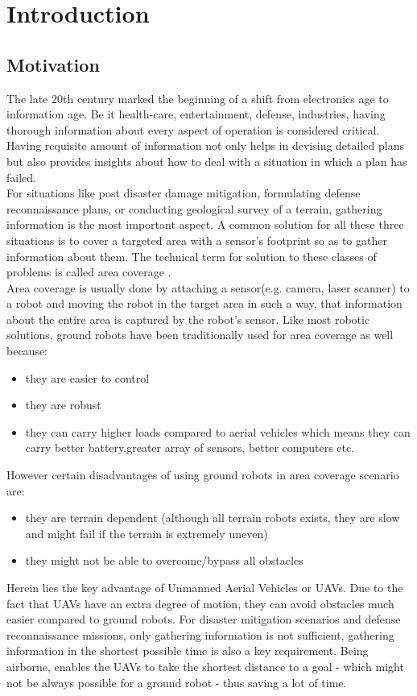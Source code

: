 \section{Introduction}
\subsection{Motivation}
The late 20th century marked the beginning of a shift from electronics age to information age. Be it  health-care, entertainment, defense, industries, having thorough information about every aspect of operation is considered critical. Having requisite amount of information not only helps in devising detailed plans but also provides insights about how to deal with a situation in which a plan has failed.\\
For situations like post disaster damage mitigation, formulating defense reconnaissance plans, or conducting geological survey of a terrain, gathering information is the most important aspect. A common solution for all these three situations is to cover a targeted area with a sensor's  footprint so as to gather information about them. The technical term for solution to these classes of problems is called area coverage \cite{1}. \\
Area coverage is usually done by attaching a sensor(e.g. camera, laser scanner) to a robot and moving the robot in the target area in such a way, that information about the entire area is captured by the robot's sensor. Like most robotic solutions, ground robots have been traditionally used for area coverage as well because:
\begin{itemize}
\item they are easier to control
\item they are robust
\item they can carry higher loads compared to aerial vehicles which means they can carry better battery,greater array of sensors, better computers etc.
\end{itemize}
However certain disadvantages of using ground robots in area coverage scenario are:
\begin{itemize}
\item they are terrain dependent (although all terrain robots exists, they are slow and might fail if the terrain is extremely uneven)
\item they might not be able to overcome/bypass all obstacles
\end{itemize}
Herein lies the key advantage of Unmanned Aerial Vehicles or UAVs. Due to the fact that UAVs have an extra degree of motion, they can avoid obstacles much easier compared to ground robots. For disaster mitigation scenarios and defense reconnaissance missions, only gathering information is not sufficient, gathering information in the shortest possible time is also a key requirement. Being airborne, enables the UAVs to take the shortest distance to a goal - which might not be always possible for a ground robot - thus saving a lot of time.\\


